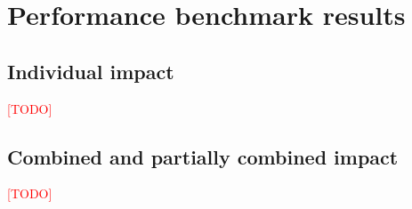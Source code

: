 
\chapter{Performance benchmark results} \label{results}
\section{Individual impact}
\textcolor{red}{[TODO]}
\section{Combined and partially combined impact}
\textcolor{red}{[TODO]}